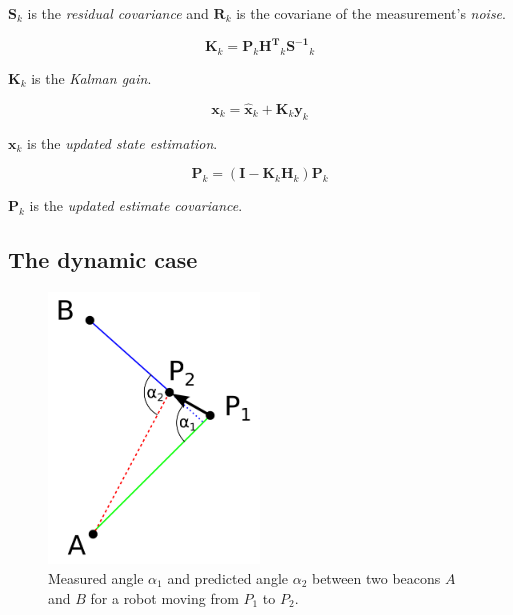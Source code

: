 \documentclass[a4paper, 12pt]{paper}
\begin{document}
$\mathbf{S}_k$ is the \emph{residual covariance} and $\mathbf{R}_k$ is the covariane
of the measurement's \emph{noise}.

\begin{equation}
    \mathbf{K}_k = \mathbf{P}_k \mathbf{H^T}_k \mathbf{S^{-1}}_k
\label{eq:kalman_gain}
\end{equation}

$\mathbf{K}_k$ is the \emph{Kalman gain}.

\begin{equation}
    \mathbf{x}_k = \mathbf{\hat x}_k + \mathbf{K}_k \mathbf{y}_k
\label{eq:updated_extimate}
\end{equation}

$\mathbf{x}_k$ is the \emph{updated state estimation}.

\begin{equation}
    \mathbf{P}_k = \left( \mathbf{I} - \mathbf{K}_k \mathbf{H}_k \right) \mathbf{P}_k
\label{eq:updated_cov}
\end{equation}

$\mathbf{P}_k$ is the \emph{updated estimate covariance}.


\subsection{The dynamic case}

\begin{figure}[H]
    \centering
    \includegraphics[width=0.5\textwidth]{dynamic_case}
    \caption{Measured angle $\alpha_1$ and predicted angle $\alpha_2$ between
    two beacons $A$ and $B$ for a robot moving from $P_1$ to $P_2$.}
\label{fig:dynamic_case}
\end{figure}
\end{document}
